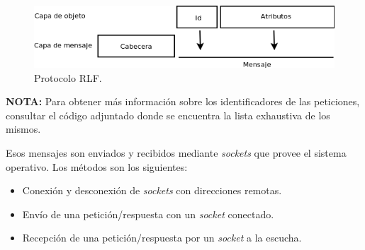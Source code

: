 \begin{figure}[h]
	\centering
	\includegraphics[scale=0.65]{images/mensaje.png}
	\caption[Protocolo RLF]{Protocolo RLF.}
	\label{fig:protocolo}
\end{figure}

\textbf{NOTA:} Para obtener más información sobre los identificadores 
de las peticiones, consultar el código adjuntado donde se encuentra la 
lista exhaustiva de los mismos.

Esos mensajes son enviados y recibidos mediante \emph{sockets} que 
provee el sistema operativo. Los métodos son los siguientes:

\begin{itemize}
\item Conexión y desconexión de \emph{sockets} con direcciones remotas.
\item Envío de una petición/respuesta con un \emph{socket} conectado.
\item Recepción de una petición/respuesta por un \emph{socket} a la 
escucha.
\end{itemize}

